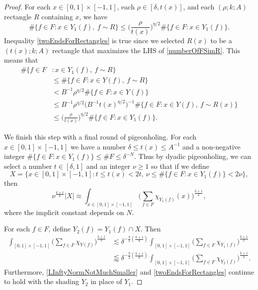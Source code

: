 \documentclass[letterpaper, reqno,11pt]{article}
\numberwithin{equation}{section}
\numberwithin{thm}{section}
\theoremstyle{remark}
\begin{document}
\begin{proof}
%
For each $x\in [0,1]\times [-1,1]$, each $\rho\in [\delta,t(x)]$, and each $(\rho;k;A)$ rectangle $R$ containing $x$, we have
\begin{equation}\label{twoEndsForRectangles}
\#\{f\in F\colon x\in Y_1(f),\ f\sim R\} \leq \big(\frac{\rho}{t(x)}\big)^{\eta/2}\#\{f\in F\colon x\in Y_1(f)\}.
\end{equation}
Inequality \eqref{twoEndsForRectangles} is true since we selected $R(x)$ to be a $(t(x); k; A)$ rectangle that maximizes the LHS of \eqref{numberOfFSimR}. This means that
%
\begin{equation*}
\begin{split}
\#\{f\in F &\colon x\in Y_1(f),\ f\sim R\} \\
& \leq \#\{f\in F\colon x\in Y(f),\ f\sim R\}\\
&< B^{-1} \rho^{\eta/2}\#\{f\in F\colon x\in Y(f)\}\\
&\leq B^{-1} \rho^{\eta/2} \big(B^{-1}t(x)^{\eta/2}\big)^{-1} \#\{f\in F\colon x\in Y(f),\ f\sim R(x)\}\\
& \leq \big(\frac{\rho}{t(x)}\big)^{\eta/2}\#\{f\in F\colon x\in Y_1(f)\}.
\end{split}
\end{equation*}

We finish this step with a final round of pigeonholing. For each $x\in[0,1]\times [-1,1]$ we have a number $\delta\leq t(x)\leq A^{-1}$ and a non-negative integer $\#\{f\in F\colon x\in Y_1(f)\}\leq \#F \leq \delta^{-N}$. Thus by dyadic pigeonholing, we can select a number $t\in[\delta,1]$ and an integer $\nu\geq 1$ so that if we define
\begin{equation}\label{defnOfSetX}
X = \big\{x\in[0,1]\times [-1,1]\colon t\leq t(x)<2t,\ \nu\leq \#\{f\in F\colon x\in Y_1(f)\}< 2\nu\big\},
\end{equation}
then
\begin{equation}\label{nuXapproxSize}
\nu^{\frac{k+1}{k}} |X|\approx\int_{x\in[0,1]\times[-1,1]}\Big(\sum_{f\in F}\chi_{Y_1(f)}(x)\Big)^{\frac{k+1}{k}},
\end{equation}
where the implicit constant depends on $N$.

For each $f\in F$, define $Y_2(f) = Y_1(f)\cap X$. Then
%
\begin{equation}\label{chain1}
\begin{split}
\int_{[0,1]\times[-1,1]}\Big(\sum_{f\in F}\chi_{Y(f)}\Big)^{\frac{k+1}{k}} & \lesssim \delta^{-\frac{\eta}{2}(\frac{k+1}{k})} \int_{[0,1]\times[-1,1]}\Big(\sum_{f\in F}\chi_{Y_1(f)}\Big)^{\frac{k+1}{k}}\\
& \lessapprox \delta^{-\frac{\eta}{2}(\frac{k+1}{k})}\int_{[0,1]\times[-1,1]}\Big(\sum_{f\in F}\chi_{Y_2(f)}\Big)^{\frac{k+1}{k}}.
\end{split}
\end{equation}
%
Furthermore, \eqref{LInftyNormNotMuchSmaller} and \eqref{twoEndsForRectangles} continue to hold with the shading $Y_2$ in place of $Y_1$. 




\end{proof}
\end{document}
